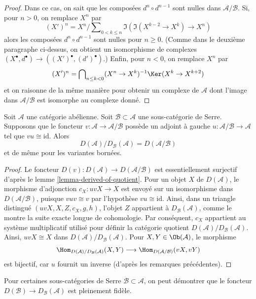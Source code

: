 \begin{proof}
\medskip\noindent
Dans ce cas, on sait que les composées $d^n \circ d^{n - 1}$ sont nulles dans
$\mathcal{A}/\mathcal{B}$. Si, pour $n > 0$, on remplace $X^n$ par
$$
(X')^n = X^n/\sum\nolimits_{0 < k \leq n}
\Im(\Im(X^{k - 2} \to X^k) \to X^n)
$$
alors les composées $d^n \circ d^{n - 1}$ sont nulles pour $n \geq 0$.
(Comme dans le deuxième paragraphe ci-dessus, on obtient un isomorphisme de
complexes
$(X^\bullet, d^\bullet) \to ((X')^\bullet, (d')^\bullet)$.) Enfin, pour
$n < 0$, on remplace $X^n$ par
$$
(X')^n = \bigcap\nolimits_{n \leq k < 0}
(X^n \to X^k)^{-1}\Ker(X^k \to X^{k + 2})
$$
et on raisonne de la même manière pour obtenir un complexe de $\mathcal{A}$
dont l'image dans $\mathcal{A}/\mathcal{B}$ est isomorphe au complexe donné.
\end{proof}

\begin{lemma}
\label{lemma-quotient-by-serre-easy}
Soit $\mathcal{A}$ une catégorie abélienne. Soit
$\mathcal{B} \subset \mathcal{A}$ une sous-catégorie de Serre. Supposons que
le foncteur $v : \mathcal{A} \to \mathcal{A}/\mathcal{B}$ possède un adjoint
à gauche $u : \mathcal{A}/\mathcal{B} \to \mathcal{A}$ tel que
$vu \cong \text{id}$. Alors
$$
D(\mathcal{A})/D_\mathcal{B}(\mathcal{A}) = D(\mathcal{A}/\mathcal{B})
$$
et de même pour les variantes bornées.
\end{lemma}

\begin{proof}
Le foncteur $D(v) : D(\mathcal{A}) \to D(\mathcal{A}/\mathcal{B})$ est
essentiellement surjectif d'après le lemme \ref{lemma-derived-of-quotient}.
Pour un objet $X$ de $D(\mathcal{A})$, le morphisme d'adjonction
$c_X : uvX \to X$ est envoyé sur un isomorphisme dans
$D(\mathcal{A}/\mathcal{B})$, puisque $vuv \cong v$ par l'hypothèse
$vu \cong \text{id}$. Ainsi, dans un triangle distingué
$(uvX, X, Z, c_X, g, h)$, l'objet $Z$ appartient à
$D_\mathcal{B}(\mathcal{A})$, comme le montre la suite exacte longue de
cohomologie. Par conséquent, $c_X$ appartient au système multiplicatif utilisé
pour définir la catégorie quotient
$D(\mathcal{A})/D_\mathcal{B}(\mathcal{A})$. Ainsi,
$uvX \cong X$ dans $D(\mathcal{A})/D_\mathcal{B}(\mathcal{A})$.
Pour $X, Y \in \Ob(\mathcal{A})$, le morphisme
$$
\Hom_{D(\mathcal{A})/D_\mathcal{B}(\mathcal{A})}(X, Y)
\longrightarrow
\Hom_{D(\mathcal{A}/\mathcal{B})}(vX, vY)
$$
est bijectif, car $u$ fournit un inverse (d'après les remarques précédentes).
\end{proof}

\noindent
Pour certaines sous-catégories de Serre
$\mathcal{B} \subset \mathcal{A}$, on peut démontrer que le foncteur
$D(\mathcal{B}) \to D_\mathcal{B}(\mathcal{A})$ est pleinement fidèle.

